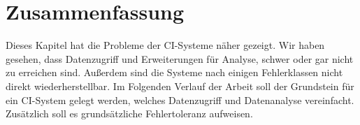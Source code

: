\section{Zusammenfassung}

Dieses Kapitel hat die Probleme der CI-Systeme n\"aher gezeigt.
Wir haben gesehen, dass Datenzugriff und Erweiterungen f\"ur Analyse,
schwer oder gar nicht zu erreichen sind.
Außerdem sind die Systeme nach einigen Fehlerklassen nicht direkt wiederherstellbar.
Im Folgenden Verlauf der Arbeit soll der Grundstein f\"ur ein CI-System gelegt werden,
welches Datenzugriff und Datenanalyse vereinfacht.
Zus\"atzlich soll es grundsätzliche Fehlertoleranz aufweisen.


